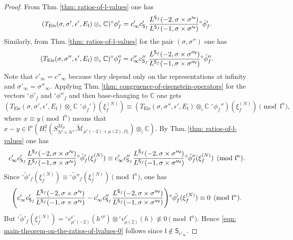 \documentclass[11pt]{amsart}
\newcommand{\sfv}{{\sf v}}
\begin{document}
\begin{proof}
From Thm.\,\ref{thm: ratios-of-l-values} one has
$$
	(T_{\text{Eis}}(\sigma, \sigma', \epsilon', E_\mathfrak{l})\otimes_{\iota}\mathbb{C}) {^\circ}\phi_f' 
	= c_\infty' c'_{\mathsf{S}_f}
	\frac{L^{\mathsf{S}_f}(-2, \sigma \times \sigma'^\sfv )}
	{L^{\mathsf{S}_f}(-1, \sigma \times \sigma'^\sfv )} 
	{^\circ}\tilde{\phi}'_f. 
$$
Similarly, from Thm.\,\ref{thm: ratios-of-l-values} for the pair $(\sigma, \sigma'')$ one has
$$
	(T_{\text{Eis}}(\sigma, \sigma'', \epsilon', E_\mathfrak{l})\otimes_{\iota}\mathbb{C})  {^\circ}\phi_f'' 
	= c_\infty'' c''_{\mathsf{S}_f}
	\frac{L^{\mathsf{S}_f}(-2, \sigma \times \sigma''^\sfv )}
	{L^{\mathsf{S}_f}(-1, \sigma \times \sigma''^\sfv )} {^\circ}\tilde{\phi}''_f.
$$
Note that $c'_\infty =c''_\infty$ because they depend only on the representations at infinity and $\sigma'_\infty = \sigma''_\infty$. 
Applying Thm.\,\ref{thm: congruence-of-eisenstein-operators} for the vectors ${^\circ}\phi'_f$ and ${^\circ}\phi''_f$ and then base-changing to $\mathbb{C}$ one gets
$$
	(T_{\text{Eis}}(\sigma, \sigma', \epsilon',E_\mathfrak{l})\otimes_{\iota} \mathbb{C}\,\,{^\circ}\phi_f')(\xi_f^{(N)}) 
	\equiv (T_{\text{Eis}}(\sigma, \sigma'', \epsilon',E_\mathfrak{l})\otimes_{\iota} \mathbb{C}\,\,{^\circ}\phi_f'')(\xi_f^{(N)}) \pmod{\mathfrak{l}^n},
$$
where $x \equiv y \pmod{\mathfrak{l}^n}$ means that $x - y 
\in \mathfrak{l}^n \left( H_!^2(S^{M_P}_{N' \times N}, \widetilde{\mathcal{M}}_{\mu'(-2)+\mu(2), \mathcal{O}_\mathfrak{l}})\otimes_\iota \mathbb{C} \right).$
By Thm.\,\ref{thm: ratios-of-l-values} one has
$$
c_\infty' c'_{\mathsf{S}_f}\frac{L^{\mathsf{S}_f}(-2, \sigma \times \sigma'^\sfv )}
{L^{\mathsf{S}_f}(-1, \sigma \times \sigma'^\sfv )} {^\circ}\tilde{\phi}'_f(\xi_f^{({N})}) 
\equiv 
c'_\infty c''_{\mathsf{S}_f}\frac{L^{\mathsf{S}_f}(-2, \sigma\times \sigma''^\sfv )}
{L^{\mathsf{S}_f}(-1, \sigma \times \sigma''^\sfv )} {^\circ}\tilde{\phi}''_f(\xi_f^{({N})}) 
\pmod{\mathfrak{l}^n}. 
$$
Since ${^\circ}\tilde{\phi}'_f(\xi_f^{({N})}) \equiv {^\circ}\tilde{\phi}''_f(\xi_f^{({N})}) \pmod{\mathfrak{l}^n}$, one has 
$$
	\Biggl(c'_\infty c'_{\mathsf{S}_f}
	\frac{L^{\mathsf{S}_f}(-2, \sigma \times \sigma'^\sfv )}
	{L^{\mathsf{S}_f}(-1, \sigma \times \sigma'^\sfv )} - 
	c'_\infty c''_{\mathsf{S}_f}
	\frac{L^{\mathsf{S}_f}(-2, \sigma \times \sigma''^\sfv )}
	{L^{\mathsf{S}_f}(-1, \sigma \times \sigma''^\sfv )}\Biggr) 
	{^\circ}\tilde{\phi'_f}(\xi_f^{({N})}) \\ \equiv 0 \pmod{\mathfrak{l}^n}. 
$$	
But ${^\circ}\tilde{\phi}'_f(\xi_f^{({N})}) = {^\circ}v_{\mu'(-2)}^{\epsilon'}(h'^\rho) \otimes 
{^\circ}v^{\epsilon'}_{\mu(2)}(h) \not\equiv 0 \pmod{{}\mathfrak{l}^n}.$ 
Hence \eqref{eqn: main-theorem-on-the-ratios-of-lvalues-0} follows since $\mathfrak{l} \notin \mathsf{S}_{c'_\infty}$.
\end{proof}
\end{document}
